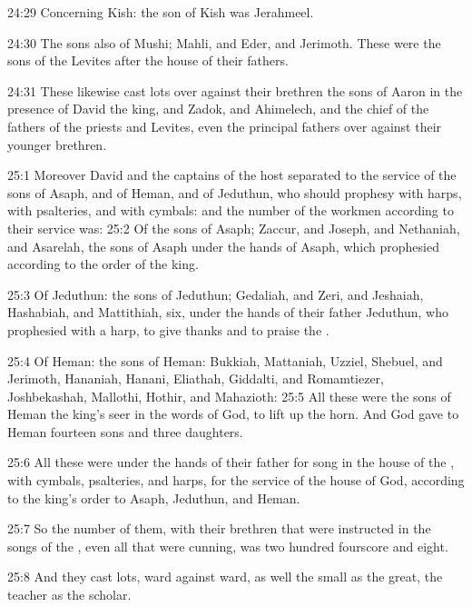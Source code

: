 24:29 Concerning Kish: the son of Kish was Jerahmeel.

24:30 The sons also of Mushi; Mahli, and Eder, and Jerimoth. These were the sons of the Levites after the house of their fathers.

24:31 These likewise cast lots over against their brethren the sons of Aaron in the presence of David the king, and Zadok, and Ahimelech, and the chief of the fathers of the priests and Levites, even the principal fathers over against their younger brethren.

25:1 Moreover David and the captains of the host separated to the service of the sons of Asaph, and of Heman, and of Jeduthun, who should prophesy with harps, with psalteries, and with cymbals: and the number of the workmen according to their service was: 25:2 Of the sons of Asaph; Zaccur, and Joseph, and Nethaniah, and Asarelah, the sons of Asaph under the hands of Asaph, which prophesied according to the order of the king.

25:3 Of Jeduthun: the sons of Jeduthun; Gedaliah, and Zeri, and Jeshaiah, Hashabiah, and Mattithiah, six, under the hands of their father Jeduthun, who prophesied with a harp, to give thanks and to praise the \LORD.

25:4 Of Heman: the sons of Heman: Bukkiah, Mattaniah, Uzziel, Shebuel, and Jerimoth, Hananiah, Hanani, Eliathah, Giddalti, and Romamtiezer, Joshbekashah, Mallothi, Hothir, and Mahazioth: 25:5 All these were the sons of Heman the king's seer in the words of God, to lift up the horn. And God gave to Heman fourteen sons and three daughters.

25:6 All these were under the hands of their father for song in the house of the \LORD, with cymbals, psalteries, and harps, for the service of the house of God, according to the king's order to Asaph, Jeduthun, and Heman.

25:7 So the number of them, with their brethren that were instructed in the songs of the \LORD, even all that were cunning, was two hundred fourscore and eight.

25:8 And they cast lots, ward against ward, as well the small as the great, the teacher as the scholar.

